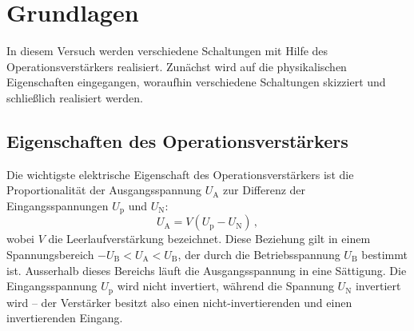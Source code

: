 \section{Grundlagen}
\label{sec:grundlagen}
In diesem Versuch werden verschiedene Schaltungen mit Hilfe des
Operationsverstärkers realisiert.
Zunächst wird auf die physikalischen Eigenschaften eingegangen,
woraufhin verschiedene Schaltungen skizziert und schließlich
realisiert werden.

\subsection{Eigenschaften des Operationsverstärkers}
\label{subsec:eigenschaften}
Die wichtigste elektrische Eigenschaft des Operationsverstärkers
ist die Proportionalität der Ausgangsspannung $U_\text{A}$ zur
Differenz der Eingangsspannungen $U_\text{p}$ und $U_\text{N}$:
\begin{equation}
\label{eq:proportionalität}
    U_\text{A} = V(U_\text{p} - U_\text{N})\,,
\end{equation}
wobei $V$ die Leerlaufverstärkung bezeichnet.
Diese Beziehung gilt in einem Spannungsbereich
$-U_\text{B} < U_\text{A} < U_\text{B}$, der durch die Betriebsspannung
$U_\text{B}$ bestimmt ist. Ausserhalb dieses Bereichs läuft die
Ausgangsspannung in eine Sättigung.
Die Eingangsspannung $U_\text{p}$ wird nicht invertiert, während die Spannung
$U_\text{N}$ invertiert wird -- der Verstärker besitzt also einen
nicht-invertierenden und einen invertierenden Eingang.

